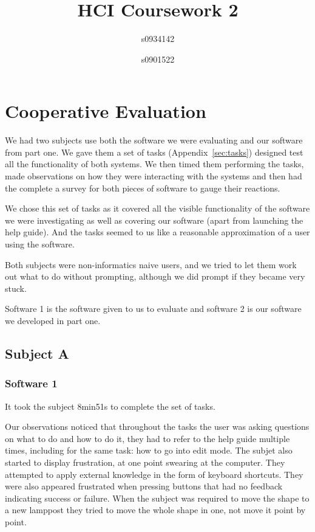 \documentclass[a4paper,11pt,oneside]{article}
\begin{document}
\title{HCI Coursework 2}
\author{s0934142 \and s0901522}
\maketitle

\section{Cooperative Evaluation}
We had two subjects use both the software we were evaluating and our software from part one.  We gave them a set of tasks (Appendix~\ref{sec:tasks}) designed test all the functionality of both systems.  We then timed them performing the tasks, made observations on how they were interacting with the systems and then had the complete a survey for both pieces of software to gauge their reactions.

We chose this set of tasks as it covered all the visible functionality of the software we were investigating as well as covering our software (apart from launching the help guide).  And the tasks seemed to us like a reasonable approximation of a user using the software.

Both subjects were non-informatics naive users, and we tried to let them work out what to do without prompting, although we did prompt if they became very stuck.

Software 1 is the software given to us to evaluate and software 2 is our software we developed in part one.

\subsection{Subject A}

\subsubsection{Software 1}
It took the subject 8min51s to complete the set of tasks. 

Our observations noticed that throughout the tasks the user was asking questions on what to do and how to do it, they had to refer to the help guide multiple times, including for the same task: how to go into edit mode.  The subjet also started to display frustration, at one point swearing at the computer.  They attempted to apply external knowledge in the form of keyboard shortcuts.  They were also appeared frustrated when pressing buttons that had no feedback indicating success or failure.  When the subject was required to move the shape to a new lamppost they tried to move the whole shape in one, not move it point by point.
\end{document}
